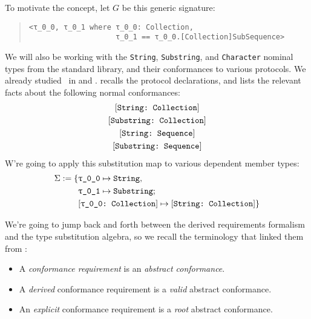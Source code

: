 \documentclass[../generics]{subfiles}
\begin{document}
\begin{example}\label{conformance path example}
To motivate the concept, let $G$ be this generic signature:
\begin{quote}
\begin{verbatim}
<τ_0_0, τ_0_1 where τ_0_0: Collection,
                    τ_0_1 == τ_0_0.[Collection]SubSequence>
\end{verbatim}
\end{quote}
We will also be working with the \texttt{String}, \texttt{Substring}, and \texttt{Character} nominal types from the standard library, and their conformances to various protocols. We already studied \tCollection\ in  and .  recalls the protocol declarations, and lists the relevant facts about the following normal conformances:
\begin{gather*}
\StringCollection\\
\SubstringCollection\\
\StringSequence\\
\SubstringSequence
\end{gather*}
W're going to apply this substitution map to various dependent member types:
\begin{align*}
\Sigma := \SubstMapC{
&\SubstType{\rT}{String},\\
&\SubstType{\rU}{Substring}
}{
\\
&\SubstConf{\rT}{String}{Collection}
}
\end{align*}

We're going to jump back and forth between the derived requirements formalism and the type substitution algebra, so we recall the terminology that linked them from :
\begin{itemize}
\item A \emph{conformance requirement} is an \emph{abstract conformance}.
\item A \emph{derived} conformance requirement is a \emph{valid} abstract conformance.
\item An \emph{explicit} conformance requirement is a \emph{root} abstract conformance.
\end{itemize}


\end{example}
\end{document}
